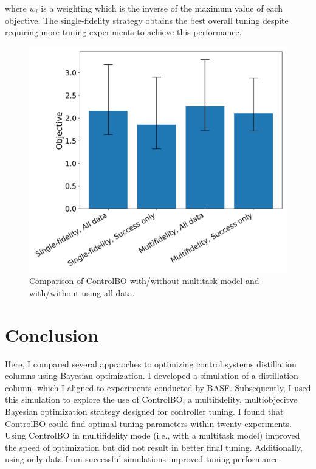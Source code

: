 where $w_i$ is a weighting which is the inverse of the maximum value of each objective. The single-fidelity strategy obtains the best overall tuning despite requiring more tuning experiments to achieve this performance. 

\begin{figure}
    \centering
    \includegraphics[width=\textwidth]{gfx/Chapter06/comparison.png}
    \caption{Comparison of ControlBO with/without multitask model and with/without using all data.}
    \label{fig:comparison_controlbo}
\end{figure}



\section{Conclusion}

Here, I compared several appraoches to optimizing control systems distillation columns using Bayesian optimization. I developed a simulation of a distillation column, which I aligned to experiments conducted by BASF. Subsequently, I used this simulation to explore the use of ControlBO, a multifidelity, multiobjecitve Bayesian optimization strategy designed for controller tuning. I found that ControlBO could find optimal tuning parameters within twenty experiments. Using ControlBO in multifidelity mode (i.e., with a multitask model) improved the speed of optimization but did not result in better final tuning. Additionally, using only data from successful simulations improved tuning performance.

